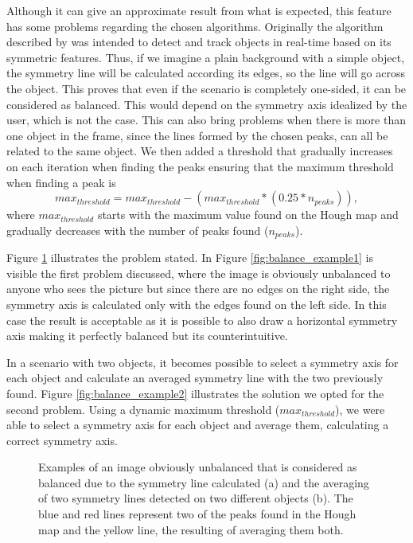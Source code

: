 Although it can give an approximate result from what is expected, this feature has some problems regarding the chosen algorithms. Originally the algorithm described by \citeauthor{li2006real} \cite{li2006real} was intended to detect and track objects in real-time based on its symmetric features. Thus, if we imagine a plain background with a simple object, the symmetry line will be calculated according its edges, so the line will go across the object. This proves that even if the scenario is completely one-sided, it can be considered as balanced. This would depend on the symmetry axis idealized by the user, which is not the case.
This can also bring problems when there is more than one object in the frame, since the lines formed by the chosen peaks, can all be related to the same object. We then added a threshold that gradually increases on each iteration when finding the peaks ensuring that the maximum threshold when finding a peak is 
\begin{equation}
	max_{threshold} = max_{threshold} - (max_{threshold}*(0.25*n_{peaks})),
\end{equation}
where $max_{threshold}$ starts with the maximum value found on the Hough map and gradually decreases with the number of peaks found ($n_{peaks}$).

Figure \ref{fig:image_balance_example} illustrates the problem stated. In Figure \ref{fig:balance_example1} is visible the first problem discussed, where the image is obviously unbalanced to anyone who sees the picture but since there are no edges on the right side, the symmetry axis is calculated only with the edges found on the left side. In this case the result is acceptable as it is possible to also draw a horizontal symmetry axis making it perfectly balanced but its counterintuitive. 

In a scenario with two objects, it becomes possible to select a symmetry axis for each object and calculate an averaged symmetry line with the two previously found. Figure \ref{fig:balance_example2} illustrates the solution we opted for the second problem. Using a dynamic maximum threshold ($max_{threshold}$), we were able to select a symmetry axis for each object and average them, calculating a correct symmetry axis.

\begin{figure}[htbp]
	\centering
    \caption{Examples of an image obviously unbalanced that is considered as balanced due to the symmetry line calculated (a) and the averaging of two symmetry lines detected on two different objects (b). The blue and red lines represent two of the peaks found in the Hough map and the yellow line, the resulting of averaging them both.}
    \label{fig:image_balance_example}
\end{figure}

